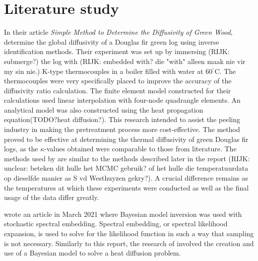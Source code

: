 \section{Literature study}\label{litstudy}
	
	In their article \textit{Simple Method to Determine the Diffusivity of Green Wood}, \citeauthor{bioresource:2020}  determine the global diffusivity of a Douglas fir green log using inverse identification methods. 
	Their experiment was set up by immersing (RIJK: submerge?) the log with (RIJK: embedded with? die "with" alleen maak nie vir my sin nie.) K-type thermocouples in a boiler filled with water at 60$^{^{\circ}}$C. 
	The thermocouples were very specifically placed to improve the accuracy of the diffusivity ratio calculation.
	The finite element model constructed for their calculations used linear interpolation with four-node quadrangle elements.
	An analytical model was also constructed using the heat propagation equation(TODO?heat diffusion?).
	This research intended to assist the peeling industry in making the pretreatment process more cost-effective.
	The method proved to be effective at determining the thermal diffusivity of green Douglas fir logs, as the $\kappa$-values obtained were comparable to those from literature.
	The methods used by \citet{bioresource:2020} are similar to the methods described later in the report (RIJK: unclear:  beteken dit hulle het MCMC gebruik? of het hulle die temperatuurdata op dieselfde manier as S vd Westhuyzen gekry?).
	A crucial difference remains as the temperatures at which these experiments were conducted as well as the final usage of the data differ greatly.


\citeauthor{Wagner:2021} wrote an article in March 2021 where Bayesian model inversion was used with stochastic spectral embedding.
Spectral embedding, or spectral likelihood expansion, is used to solve for the likelihood function in such a way that sampling is not necessary.
Similarly to this report, the research of \citeauthor{Wagner:2021} involved the creation and use of a Bayesian model to solve a heat diffusion problem.

